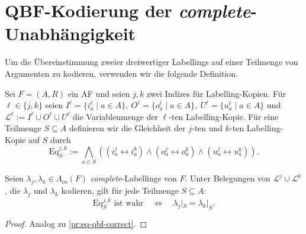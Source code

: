 \section{QBF-Kodierung der \textit{complete}-Unabhängigkeit}

Um die Übereinstimmung zweier dreiwertiger Labellings auf einer Teilmenge von
Argumenten zu kodieren, verwenden wir die folgende Definition.

\begin{Definition}
    \label{def:eq-qbf-3l}
    Sei \(F=(A,R)\) ein AF und seien \(j,k\) zwei Indizes für
    Labelling-Kopien. Für \(\ell\in\{j,k\}\) seien 
    \(I^\ell=\{i_a^\ell\mid a\in A\},~O^\ell=\{o_a^\ell \mid a\in A\},~ 
    U^\ell=\{u_a^\ell \mid a\in A\} \)
    und \(\mathcal{L}^\ell := I^\ell\cup O^\ell\cup U^\ell \)
    die Variablenmenge der \(\ell\)-ten Labelling-Kopie. Für eine
    Teilmenge \(S\subseteq A\) definieren wir die Gleichheit der
    \(j\)-ten und \(k\)-ten Labelling-Kopie auf \(S\) durch
    \[
        \mathrm{Eq}^{j,k}_S
        :=
        \bigwedge_{a\in S}
        \left(
            (i_a^j \leftrightarrow i_a^k)
            \land 
            (o_a^j \leftrightarrow o_a^k)
            \land
            (u_a^j \leftrightarrow u_a^k)
        \right).
    \]
\end{Definition}

\begin{Lemma}
    \label{le:eq-qbf-3l-correct}
    Seien \(\lambda_j,\lambda_k\in\Lambda_{\mathrm{co}}(F)\)
    \textit{complete}-Labellings von \(F\). Unter Belegungen von
    \(\mathcal{L}^j\cup \mathcal{L}^k\), die \(\lambda_j\) und 
    \(\lambda_k\) kodieren, gilt für jede Teilmenge \(S\subseteq A\):
    \[
        \mathrm{Eq}^{j,k}_S \text{ ist wahr}
        \quad\Longleftrightarrow\quad
        \lambda_j|_S=\lambda_k|_S.
    \]
\end{Lemma}

\begin{proof}
    Analog zu \ref{pr:eq-qbf-correct}.
\end{proof}

